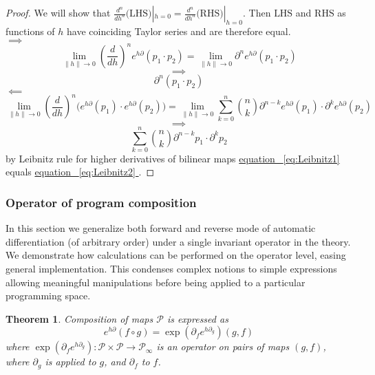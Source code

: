 \documentclass{article}
\makeatletter
\newcommand{\dP}{\mathcal{P}}
\newcommand{\D}{\partial}
\newtheorem{izrek}{Theorem}[section]
\let\originaleqref\eqref %
\renewcommand{\eqref}[1]{%
  \begingroup%
  \let\ref\@refstar%
  \hyperref[#1]{%
    equation%
    ~\originaleqref{#1}%
  }%
  \endgroup
}
\makeatother
\begin{document}
 \begin{proof}
 We will show that $\frac{d^n}{dh^n}\text{(LHS)}|_{h=0}=\frac{d^n}{dh^n}\text{(RHS)}|_{h=0}$. Then $\text{LHS}$ and $\text{RHS}$ as functions
 of $h$ have coinciding Taylor series and are therefore equal.\\
  $\implies$
  $$\lim\limits_{\lVert h\rVert\to 0}(\frac{d}{dh})^ne^{h\D}(p_1\cdot p_2)=\lim\limits_{\lVert h\rVert\to 0}\D^ne^{h\D}(p_1\cdot p_2)$$
  $$\implies$$
  \begin{equation}\label{eq:Leibnitz1}
  \D^n(p_1\cdot p_2)
  \end{equation}
  $\impliedby$
  $$\lim\limits_{\lVert h\rVert\to 0}(\frac{d}{dh})^n\Big(e^{h\D}(p_1)\cdot e^{h\D}(p_2)\Big)=\lim\limits_{\lVert h\rVert\to 0}\sum\limits_{k=0}^{n}{n\choose k}\D^{n-k}e^{h\D}(p_1)\cdot \D^ke^{h\D}(p_2)$$
  $$\implies$$
  \begin{equation}\label{eq:Leibnitz2}
  \sum\limits_{k=0}^{n}{n\choose k}\D^{n-k}p_1\cdot \D^kp_2
  \end{equation}
  by Leibnitz rule for higher derivatives of bilinear maps \eqref{eq:Leibnitz1} equals \eqref{eq:Leibnitz2}.
 \end{proof}
 
 \subsubsection{Operator of program composition}
 
 In this section we generalize both forward and reverse mode of automatic differentiation (of arbitrary order) under a single invariant operator in the theory. We demonstrate how calculations can be performed on the operator level, easing general implementation. This condenses complex notions to simple expressions allowing meaningful manipulations before being applied to a particular programming space.
 
 \begin{izrek}\label{izr:kompo}
 Composition of maps $\dP$ is expressed as
 \begin{equation}\label{eq:kompo}
 e^{h\D}(f\circ g)=\exp(\D_fe^{h\D_g})(g,f)
 \end{equation}
 where $\exp(\D_fe^{h\D_g}):\dP\times\dP\to\dP_\infty$ is an operator on pairs of maps $(g,f)$, where $\D_g$ is applied to $g$, and $\D_f$ to $f$. 
 \end{izrek}
 
\end{document}

